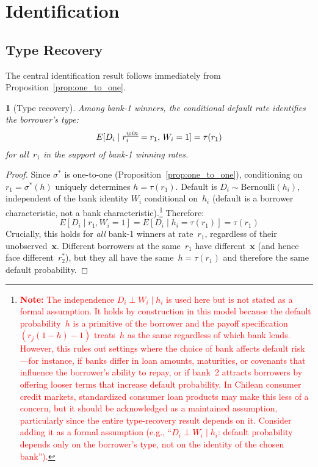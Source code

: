 \documentclass[12pt]{article}
\theoremstyle{plain}
\theoremstyle{plain}
\newtheorem{prop}[thm]{\protect\propositionname}
\theoremstyle{definition}
\theoremstyle{remark}
\providecommand{\propositionname}{Proposition}
\begin{document}
\newpage
\section{Identification}\label{sec:id8}

\subsection{Type Recovery}\label{sec:type_recovery8}

The central identification result follows immediately from Proposition~\ref{prop:one_to_one}.

\begin{prop}[Type recovery]\label{prop:type_recovery8}
Among bank-1 winners, the conditional default rate identifies the borrower's type:
\begin{align}\label{eq:type_recovery8}
    E[D_i \mid r_i^{\emph{win}} = r_1,\, W_i = 1] = \tau(r_1)
\end{align}
for all~$r_1$ in the support of bank-1 winning rates.
\end{prop}

\begin{proof}
Since $\sigma^*$ is one-to-one (Proposition~\ref{prop:one_to_one}), conditioning on $r_1 = \sigma^*(h)$ uniquely determines $h = \tau(r_1)$.  Default is $D_i \sim \text{Bernoulli}(h_i)$, independent of the bank identity $W_i$ conditional on~$h_i$ (default is a borrower characteristic, not a bank characteristic).\footnote{\textcolor{red}{\textbf{Note:} The independence $D_i \perp W_i \mid h_i$ is used here but is not stated as a formal assumption.  It holds by construction in this model because the default probability~$h$ is a primitive of the borrower and the payoff specification $(r_j(1-h) - 1)$ treats~$h$ as the same regardless of which bank lends.  However, this rules out settings where the choice of bank affects default risk---for instance, if banks differ in loan amounts, maturities, or covenants that influence the borrower's ability to repay, or if bank~2 attracts borrowers by offering looser terms that increase default probability.  In Chilean consumer credit markets, standardized consumer loan products may make this less of a concern, but it should be acknowledged as a maintained assumption, particularly since the entire type-recovery result depends on it.  Consider adding it as a formal assumption (e.g., ``$D_i \perp W_i \mid h_i$: default probability depends only on the borrower's type, not on the identity of the chosen bank'').}}  Therefore:
\[
    E[D_i \mid r_1, W_i = 1] = E[D_i \mid h_i = \tau(r_1)] = \tau(r_1)
\]
Crucially, this holds for \emph{all} bank-1 winners at rate~$r_1$, regardless of their unobserved~$\mathbf{x}$.  Different borrowers at the same~$r_1$ have different~$\mathbf{x}$ (and hence face different~$r_2^*$), but they all have the same~$h = \tau(r_1)$ and therefore the same default probability.
\end{proof}
\end{document}
